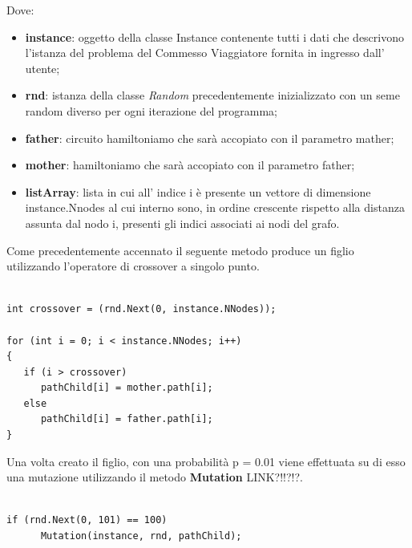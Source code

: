 \documentclass[11pt]{article}
\begin{document}
Dove:

\begin{itemize}
    \item \textbf{instance}: oggetto della classe Instance contenente tutti i dati che descrivono l'istanza del problema del Commesso Viaggiatore fornita in ingresso dall' utente;
    \item \textbf{rnd}: istanza della classe \textit{Random} precedentemente inizializzato con un seme random diverso per ogni iterazione del programma;
    \item \textbf{father}: circuito hamiltoniamo che sarà accopiato con il parametro mather;
    \item \textbf{mother}: hamiltoniamo che sarà accopiato con il parametro father;
    \item \textbf{listArray}: lista in cui all’ indice i è presente un vettore di dimensione instance.Nnodes al cui interno sono, in ordine crescente rispetto alla distanza assunta dal nodo i, presenti gli indici associati ai nodi del grafo.
\end{itemize}

Come precedentemente accennato il seguente metodo produce un figlio utilizzando l'operatore di crossover a singolo punto.

\begin{lstlisting}

int crossover = (rnd.Next(0, instance.NNodes));

for (int i = 0; i < instance.NNodes; i++)
{
   if (i > crossover)
      pathChild[i] = mother.path[i];
   else
      pathChild[i] = father.path[i];
}

\end{lstlisting}


Una volta creato il figlio, con una probabilità p = 0.01 viene effettuata su di esso una mutazione utilizzando il metodo \textbf{Mutation} LINK?!!?!?.


\begin{lstlisting}

if (rnd.Next(0, 101) == 100)
      Mutation(instance, rnd, pathChild);

\end{lstlisting}
\end{document}
